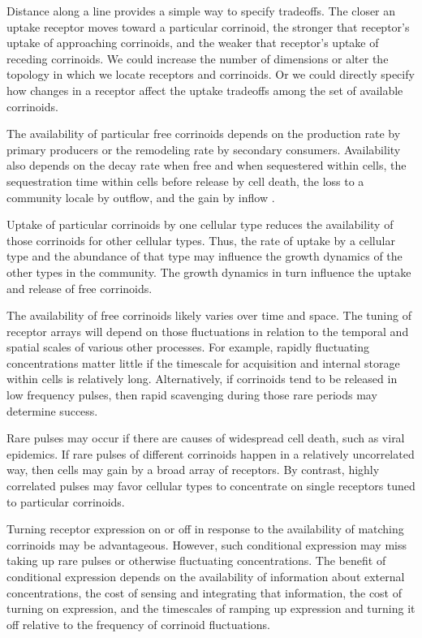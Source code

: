\documentclass[\mydocfontsize]{article}
\begin{document}
\begin{multicols}{2}
 Distance along a line provides a simple way to specify tradeoffs. The closer an uptake receptor moves toward a particular corrinoid, the stronger that receptor's uptake of approaching corrinoids, and the weaker that receptor's uptake of receding corrinoids. We could increase the number of dimensions or alter the topology in which we locate receptors and corrinoids. Or we could directly specify how changes in a receptor affect the uptake tradeoffs among the set of available corrinoids. 

 The availability of particular free corrinoids depends on the production rate by primary producers or the remodeling rate by secondary consumers. Availability also depends on the decay rate when free and when sequestered within cells, the sequestration time within cells before release by cell death, the loss to a community locale by outflow, and the gain by inflow \autocite{frank14microbial}. 

 Uptake of particular corrinoids by one cellular type reduces the availability of those corrinoids for other cellular types. Thus, the rate of uptake by a cellular type and the abundance of that type may influence the growth dynamics of the other types in the community. The growth dynamics in turn influence the uptake and release of free corrinoids. 

 The availability of free corrinoids likely varies over time and space. The tuning of receptor arrays will depend on those fluctuations in relation to the temporal and spatial scales of various other processes. For example, rapidly fluctuating concentrations matter little if the timescale for acquisition and internal storage within cells is relatively long. Alternatively, if corrinoids tend to be released in low frequency pulses, then rapid scavenging during those rare periods may determine success. 

Rare pulses may occur if there are causes of widespread cell death, such as viral epidemics. If rare pulses of different corrinoids happen in a relatively uncorrelated way, then cells may gain by a broad array of receptors. By contrast, highly correlated pulses may favor cellular types to concentrate on single receptors tuned to particular corrinoids. 

 Turning receptor expression on or off in response to the availability of matching corrinoids may be advantageous. However, such conditional expression may miss taking up rare pulses or otherwise fluctuating concentrations. The benefit of conditional expression depends on the availability of information about external concentrations, the cost of sensing and integrating that information, the cost of turning on expression, and the timescales of ramping up expression and turning it off relative to the frequency of corrinoid fluctuations.


\end{multicols}
\end{document}
